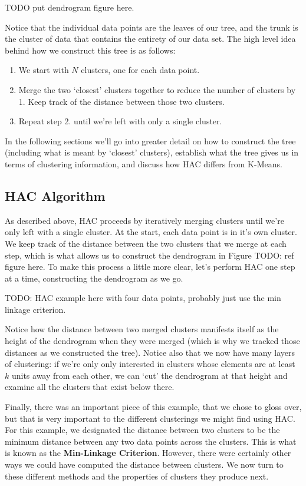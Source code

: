 TODO put dendrogram figure here.

Notice that the individual data points are the leaves of our tree, and the trunk is the cluster of data that contains the entirety of our data set. The high level idea behind how we construct this tree is as follows:

\begin{enumerate}
    \item We start with $N$ clusters, one for each data point.
    \item Merge the two `closest' clusters together to reduce the number of clusters by 1. Keep track of the distance between those two clusters.
    \item Repeat step 2. until we're left with only a single cluster.
\end{enumerate}

In the following sections we'll go into greater detail on how to construct the tree (including what is meant by `closest' clusters), establish what the tree gives us in terms of clustering information, and discuss how HAC differs from K-Means.

\subsection{HAC Algorithm}
As described above, HAC proceeds by iteratively merging clusters until we're only left with a single cluster. At the start, each data point is in it's own cluster. We keep track of the distance between the two clusters that we merge at each step, which is what allows us to construct the dendrogram in Figure TODO: ref figure here. To make this process a little more clear, let's perform HAC one step at a time, constructing the dendrogram as we go.

TODO: HAC example here with four data points, probably just use the min linkage criterion.

Notice how the distance between two merged clusters manifests itself as the height of the dendrogram when they were merged (which is why we tracked those distances as we constructed the tree). Notice also that we now have many layers of clustering: if we're only only interested in clusters whose elements are at least $k$ units away from each other, we can `cut' the dendrogram at that height and examine all the clusters that exist below there.

Finally, there was an important piece of this example, that we chose to gloss over, but that is very important to the different clusterings we might find using HAC. For this example, we designated the distance between two clusters to be the minimum distance between any two data points across the clusters. This is what is known as the \textbf{Min-Linkage Criterion}. However, there were certainly other ways we could have computed the distance between clusters. We now turn to these different methods and the properties of clusters they produce next.

